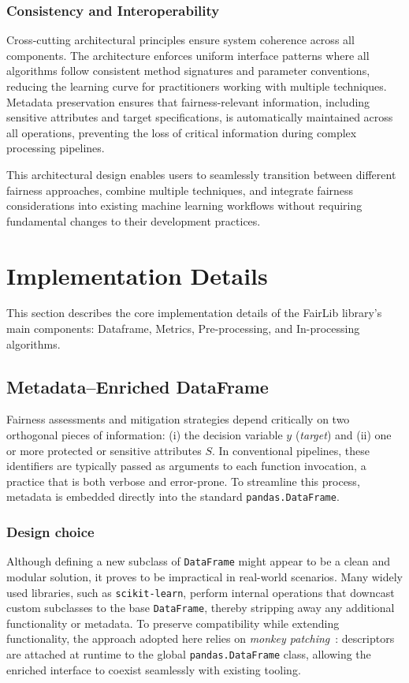 \documentclass[12pt,a4paper,openright,twoside]{book}
\begin{document}
\subsection{Consistency and Interoperability}

Cross-cutting architectural principles ensure system coherence across all components. The architecture enforces uniform interface patterns where all algorithms follow consistent method signatures and parameter conventions, reducing the learning curve for practitioners working with multiple techniques. Metadata preservation ensures that fairness-relevant information, including sensitive attributes and target specifications, is automatically maintained across all operations, preventing the loss of critical information during complex processing pipelines.

This architectural design enables users to seamlessly transition between different fairness approaches, combine multiple techniques, and integrate fairness considerations into existing machine learning workflows without requiring fundamental changes to their development practices.

\chapter{Implementation Details}
This section describes the core implementation details of the FairLib library's main components: Dataframe, Metrics, Pre-processing, and In-processing algorithms.

\section{Metadata--Enriched DataFrame}

Fairness assessments and mitigation strategies depend critically on two orthogonal pieces of information: (i) the decision variable $y$ (\emph{target}) and (ii) one or more protected or sensitive attributes $S$. In conventional pipelines, these identifiers are typically passed as arguments to each function invocation, a practice that is both verbose and error-prone. To streamline this process, metadata is embedded directly into the standard \texttt{pandas.DataFrame}.

\subsection{Design choice} Although defining a new subclass of \texttt{DataFrame} might appear to be a clean and modular solution, it proves to be impractical in real-world scenarios. Many widely used libraries, such as \texttt{scikit-learn}, perform internal operations that downcast custom subclasses to the base \texttt{DataFrame}, thereby stripping away any additional functionality or metadata. To preserve compatibility while extending functionality, the approach adopted here relies on \emph{monkey patching}~\cite{carattino2019monkey}: descriptors are attached at runtime to the global \texttt{pandas.DataFrame} class, allowing the enriched interface to coexist seamlessly with existing tooling.
\end{document}
